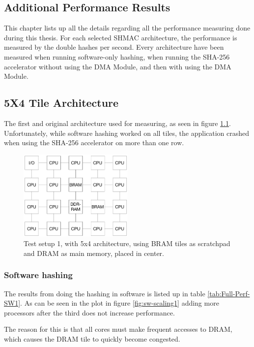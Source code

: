 \begin{appendix}
\chapter{Additional Performance Results}
\label{app:performance}

This chapter lists up all the details regarding all the performance measuring done during this thesis.
For each selected SHMAC architecture, the performance is measured by the double hashes per second.
Every architecture have been measured when running software-only hashing, when running the SHA-256 accelerator without using the DMA Module, and then with using the DMA Module. 

\section{5X4 Tile Architecture}

The first and original architecture used for measuring, as seen in figure \ref{fig:5x4-2}.
Unfortunately, while software hashing worked on all tiles, the application crashed when using the SHA-256 accelerator on more than one row.

\begin{figure}[htb]
    \centering
    \includegraphics[width=0.5\textwidth]{Figures/Measurements/5x4}
    \caption{Test setup 1, with 5x4 architecture, using BRAM tiles as scratchpad and DRAM as main memory, placed in center.}
    \label{fig:5x4-2}
\end{figure}

\subsection{Software hashing}

The results from doing the hashing in software is listed up in table \ref{tab:Full-Perf-SW1}. 
As can be seen in the plot in figure \ref{fig:sw-scaling1} adding more processors after the third does not increase performance.

The reason for this is that all cores must make frequent accesses to DRAM, which causes the
DRAM tile to quickly become congested.


\end{appendix}
